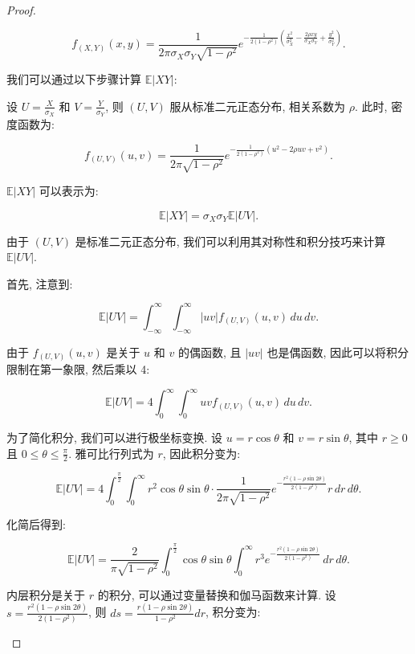 \documentclass[UTF8, a4paper]{article}
\begin{document}
\begin{proof}
\begin{enumerate}[a)]
    \[
    f_{(X, Y)}(x, y) = \frac{1}{2 \pi \sigma_X \sigma_Y \sqrt{1-\rho^2}} e^{-\frac{1}{2(1-\rho^2)}\left(\frac{x^2}{\sigma_X^2} - \frac{2 \rho x y}{\sigma_X \sigma_Y} + \frac{y^2}{\sigma_Y^2}\right)}.
    \]
    
    我们可以通过以下步骤计算 \(\mathbb{E}|XY|\): 
    
       设 \(U = \frac{X}{\sigma_X}\) 和 \(V = \frac{Y}{\sigma_Y}\), 则 \((U, V)\) 服从标准二元正态分布, 相关系数为 \(\rho\). 此时, 密度函数为: 
    
       \[
       f_{(U, V)}(u, v) = \frac{1}{2 \pi \sqrt{1-\rho^2}} e^{-\frac{1}{2(1-\rho^2)}(u^2 - 2 \rho u v + v^2)}.
       \]
    
       \(\mathbb{E}|XY|\) 可以表示为: 
    
       \[
       \mathbb{E}|XY| = \sigma_X \sigma_Y \mathbb{E}|UV|.
       \]

       由于 \((U, V)\) 是标准二元正态分布, 我们可以利用其对称性和积分技巧来计算 \(\mathbb{E}|UV|\). 
    
       首先, 注意到: 
    
       \[
       \mathbb{E}|UV| = \int_{-\infty}^{\infty} \int_{-\infty}^{\infty} |uv| f_{(U, V)}(u, v) \, du \, dv.
       \]
    
       由于 \(f_{(U, V)}(u, v)\) 是关于 \(u\) 和 \(v\) 的偶函数, 且 \(|uv|\) 也是偶函数, 因此可以将积分限制在第一象限, 然后乘以 4: 
    
       \[
       \mathbb{E}|UV| = 4 \int_{0}^{\infty} \int_{0}^{\infty} uv f_{(U, V)}(u, v) \, du \, dv.
       \]
    
       为了简化积分, 我们可以进行极坐标变换. 设 \(u = r \cos \theta\) 和 \(v = r \sin \theta\), 其中 \(r \geq 0\) 且 \(0 \leq \theta \leq \frac{\pi}{2}\). 雅可比行列式为 \(r\), 因此积分变为: 
    
       \[
       \mathbb{E}|UV| = 4 \int_{0}^{\frac{\pi}{2}} \int_{0}^{\infty} r^2 \cos \theta \sin \theta \cdot \frac{1}{2 \pi \sqrt{1-\rho^2}} e^{-\frac{r^2 (1 - \rho \sin 2\theta)}{2(1-\rho^2)}} r \, dr \, d\theta.
       \]
    
       化简后得到: 
    
       \[
       \mathbb{E}|UV| = \frac{2}{\pi \sqrt{1-\rho^2}} \int_{0}^{\frac{\pi}{2}} \cos \theta \sin \theta \int_{0}^{\infty} r^3 e^{-\frac{r^2 (1 - \rho \sin 2\theta)}{2(1-\rho^2)}} \, dr \, d\theta.
       \]

       内层积分是关于 \(r\) 的积分, 可以通过变量替换和伽马函数来计算. 设 \(s = \frac{r^2 (1 - \rho \sin 2\theta)}{2(1-\rho^2)}\), 则 \(ds = \frac{r (1 - \rho \sin 2\theta)}{1-\rho^2} dr\), 积分变为: 
    

\end{enumerate}
\end{proof}
\end{document}
